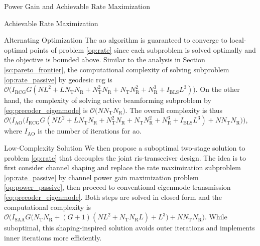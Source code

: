 \documentclass[journal]{IEEEtran}
\begin{document}
\begin{section}{Power Gain and Achievable Rate Maximization}
\begin{subsection}{Achievable Rate Maximization}
\begin{subsubsection}{Alternating Optimization}
			The \gls{ao} algorithm is guaranteed to converge to local-optimal points of problem \eqref{op:rate} since each subproblem is solved optimally and the objective is bounded above.
			Similar to the analysis in Section \ref{sc:pareto_frontier}, the computational complexity of solving subproblem \eqref{op:rate_passive} by geodesic \gls{rcg} is $\mathcal{O}\bigl(I_\text{RCG} G (NL^2 + L N_\mathrm{T} N_\mathrm{R} + N_\mathrm{T}^2 N_\mathrm{R} + N_\mathrm{T} N_\mathrm{R}^2 + N_\mathrm{R}^3 + I_\text{BLS} L^3)\bigr)$.
			On the other hand, the complexity of solving active beamforming subproblem by \eqref{eq:precoder_eigenmode} is $\mathcal{O}\bigl(N N_\mathrm{T} N_\mathrm{R}\bigr)$.
			The overall complexity is thus $\mathcal{O}\bigl(I_\text{AO}\bigl(I_\text{RCG} G (NL^2 + L N_\mathrm{T} N_\mathrm{R} + N_\mathrm{T}^2 N_\mathrm{R} + N_\mathrm{T} N_\mathrm{R}^2 + N_\mathrm{R}^3 + I_\text{BLS} L^3) + N N_\mathrm{T} N_\mathrm{R}\bigr)\bigr)$, where $I_\text{AO}$ is the number of iterations for \gls{ao}.
		\end{subsubsection}

		\begin{subsubsection}{Low-Complexity Solution}\label{sc:low_complexity}
			We then propose a suboptimal two-stage solution to problem \eqref{op:rate} that decouples the joint \gls{ris}-transceiver design.
			The idea is to first consider channel shaping and replace the rate maximization subproblem \eqref{op:rate_passive} by channel power gain maximization problem \eqref{op:power_passive}, then proceed to conventional eigenmode transmission \eqref{eq:precoder_eigenmode}.
			Both steps are solved in closed form and the computational complexity is $\mathcal{O}\bigl(I_\text{SAA} G \bigl(N_\mathrm{T} N_\mathrm{R} + (G+1)(NL^2+N_\mathrm{T} N_\mathrm{R} L) + L^3\bigr) + N N_\mathrm{T} N_\mathrm{R}\bigr)$.
			While suboptimal, this shaping-inspired solution avoids outer iterations and implements inner iterations more efficiently.
		\end{subsubsection}
	\end{subsection}
\end{section}
\end{document}
